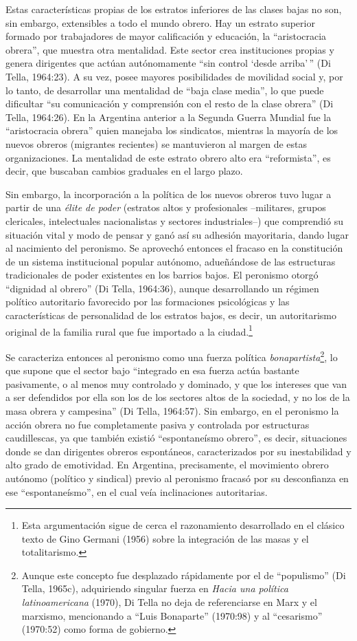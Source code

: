 Estas características propias de los estratos inferiores de las clases bajas no son, sin embargo, extensibles a todo el mundo obrero. Hay un estrato superior formado por trabajadores de mayor calificación y educación, la ``aristocracia obrera'', que muestra otra mentalidad. Este sector crea instituciones propias y genera dirigentes que actúan autónomamente ``sin control `desde arriba'\,'' (Di Tella, 1964:23). A su vez, posee mayores posibilidades de movilidad social y, por lo tanto, de desarrollar una mentalidad de ``baja clase media'', lo que puede dificultar ``su comunicación y comprensión con el resto de la clase obrera'' (Di Tella, 1964:26). En la Argentina anterior a la Segunda Guerra Mundial fue la ``aristocracia obrera'' quien manejaba los sindicatos, mientras la mayoría de los nuevos obreros (migrantes recientes) se mantuvieron al margen de estas organizaciones. La mentalidad de este estrato obrero alto era ``reformista'', es decir, que buscaban cambios graduales en el largo plazo.

Sin embargo, la incorporación a la política de los nuevos obreros tuvo lugar a partir de una \emph{élite de poder} (estratos altos y profesionales --militares, grupos clericales, intelectuales nacionalistas y sectores industriales--) que comprendió su situación vital y modo de pensar y ganó así su adhesión mayoritaria, dando lugar al nacimiento del peronismo. Se aprovechó entonces el fracaso en la constitución de un sistema institucional popular autónomo, adueñándose de las estructuras tradicionales de poder existentes en los barrios bajos. El peronismo otorgó ``dignidad al obrero'' (Di Tella, 1964:36), aunque desarrollando un régimen político autoritario favorecido por las formaciones psicológicas y las características de personalidad de los estratos bajos, es decir, un autoritarismo original de la familia rural que fue importado a la ciudad.\footnote{Esta argumentación sigue de cerca el razonamiento desarrollado en el clásico texto de Gino Germani (1956) sobre la integración de las masas y el totalitarismo.}

Se caracteriza entonces al peronismo como una fuerza política \emph{bonapartista}\footnote{Aunque este concepto fue desplazado rápidamente por el de ``populismo'' (Di Tella, 1965c), adquiriendo singular fuerza en \emph{Hacia una política latinoamericana} (1970), Di Tella no deja de referenciarse en Marx y el marxismo, mencionando a ``Luis Bonaparte'' (1970:98) y al ``cesarismo'' (1970:52) como forma de gobierno.}, lo que supone que el sector bajo ``integrado en esa fuerza actúa bastante pasivamente, o al menos muy controlado y dominado, y que los intereses que van a ser defendidos por ella son los de los sectores altos de la sociedad, y no los de la masa obrera y campesina'' (Di Tella, 1964:57). Sin embargo, en el peronismo la acción obrera no fue completamente pasiva y controlada por estructuras caudillescas, ya que también existió ``espontaneísmo obrero'', es decir, situaciones donde se dan dirigentes obreros espontáneos, caracterizados por su inestabilidad y alto grado de emotividad. En Argentina, precisamente, el movimiento obrero autónomo (político y sindical) previo al peronismo fracasó por su desconfianza en ese ``espontaneísmo'', en el cual veía inclinaciones autoritarias.

